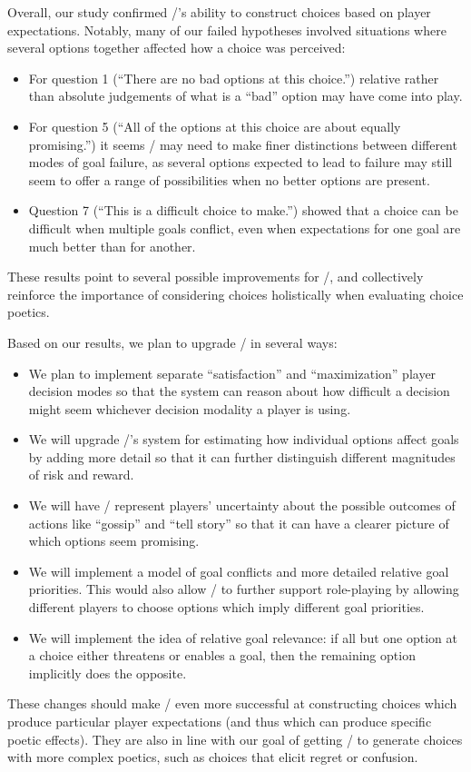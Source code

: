 Overall, our study confirmed \dunyazad/'s ability to construct choices based on player expectations.
%
Notably, many of our failed hypotheses involved situations where several options together affected how a choice was perceived:
%
\begin{itemize}
  \item For question 1 (``There are no bad options at this choice.'') relative rather than absolute judgements of what is a ``bad'' option may have come into play.
  \item For question 5 (``All of the options at this choice are about equally promising.'') it seems \dunyazad/ may need to make finer distinctions between different modes of goal failure, as several options expected to lead to failure may still seem to offer a range of possibilities when no better options are present.
  \item Question 7 (``This is a difficult choice to make.'') showed that a choice can be difficult when multiple goals conflict, even when expectations for one goal are much better than for another.
\end{itemize}
%
These results point to several possible improvements for \dunyazad/, and collectively reinforce the importance of considering choices holistically when evaluating choice poetics.


Based on our results, we plan to upgrade \dunyazad/ in several ways:
%
\begin{itemize}
  \item We plan to implement separate ``satisfaction'' and ``maximization'' player decision modes so that the system can reason about how difficult a decision might seem whichever decision modality a player is using.
  \item We will upgrade \dunyazad/'s system for estimating how individual options affect goals by adding more detail so that it can further distinguish different magnitudes of risk and reward.
  \item We will have \dunyazad/ represent players' uncertainty about the possible outcomes of actions like ``gossip'' and ``tell story'' so that it can have a clearer picture of which options seem promising.
  \item We will implement a model of goal conflicts and more detailed relative goal priorities. This would also allow \dunyazad/ to further support role-playing by allowing different players to choose options which imply different goal priorities.
  \item We will implement the idea of relative goal relevance: if all but one option at a choice either threatens or enables a goal, then the remaining option implicitly does the opposite.
\end{itemize}
%
These changes should make \dunyazad/ even more successful at constructing choices which produce particular player expectations (and thus which can produce specific poetic effects).
%
They are also in line with our goal of getting \dunyazad/ to generate choices with more complex poetics, such as choices that elicit regret or confusion.


